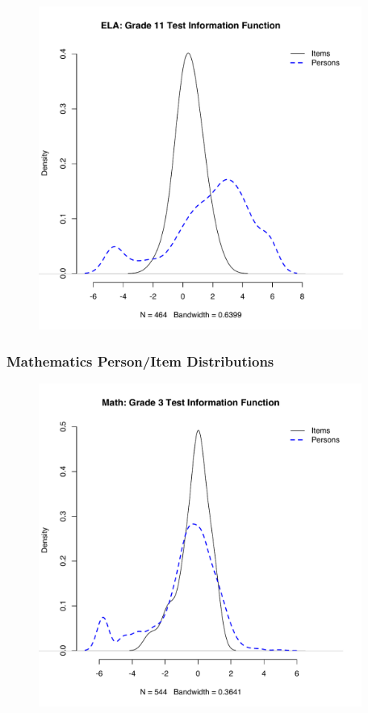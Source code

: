 \documentclass[]{article}
\begin{document}
\begin{figure}
\centering
\includegraphics[height=4.16667in]{ipdens/ela11ipdens.pdf}
\caption{}
\end{figure}

\subsubsection{Mathematics Person/Item
Distributions}\label{mathematics-personitem-distributions}

\begin{figure}
\centering
\includegraphics[height=4.16667in]{ipdens/math3ipdens.pdf}
\caption{}
\end{figure}
\end{document}
